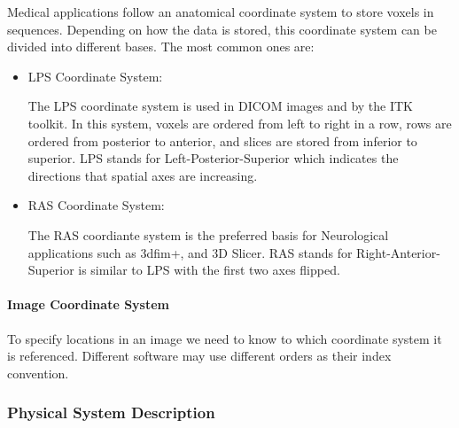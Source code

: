 \documentclass[12pt]{article}
\begin{document}
Medical applications follow an anatomical coordinate system to store voxels in sequences. Depending on how the data is stored, this coordinate system can be divided into different bases. The most common ones are:
\begin{itemize}
\item{LPS Coordinate System:}

The LPS coordinate system is used in DICOM images and by the ITK toolkit. In this system, voxels are ordered from left to right in a row, rows are ordered from posterior to anterior, and slices are stored from inferior to superior.
\indent
LPS stands for Left-Posterior-Superior which indicates the directions that spatial axes are increasing.
\item{RAS Coordinate System:}

The RAS coordiante system is the preferred basis for Neurological applications such as 3dfim+, and 3D Slicer. RAS stands for Right-Anterior-Superior is similar to LPS with the first two axes flipped.
\end{itemize}

\paragraph{Image Coordinate System}
To specify locations in an image we need to know to which coordinate system it is referenced. Different software may use different orders as their index convention.


\subsubsection{Physical System Description} \label{sec_phySystDescrip}

\end{document}
